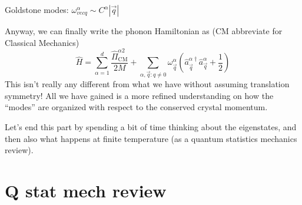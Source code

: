 Goldstone modes: $\omega_{vec{q}}^\alpha\sim C^\alpha |\vec{q}|$

Anyway, we can finally write the phonon Hamiltonian as (CM abbreviate for Classical Mechanics)
\[ \hat{H}=\sum_{\alpha =1}^d{\frac{\hat{\Pi}_{\mathrm{CM}}^{\alpha 2}}{2M}}+\sum_{\alpha ,\vec{q}:q\ne 0}{\omega _{\vec{q}}^{\alpha}\left( \hat{a}_{\vec{q}}^{\alpha \dagger}\hat{a}_{\vec{q}}^{\alpha}+\frac{1}{2} \right)}\]
This isn't really any different from what we have without assuming translation symmetry! All we have gained is a more refined understanding on how the ``modes'' are organized with respect to the conserved crystal momentum.

Let's end this part by spending a bit of time thinking about the eigenstates, and then also what happens at finite temperature (as a quantum statistics mechanics review).

\section{Q stat mech review}

